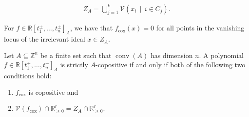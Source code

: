 \documentclass[10pt,a4paper]{amsart}
\DeclareMathOperator{\conv}{conv}
\newcommand{\RR}{\mathbb{R}}
\newcommand{\cox}{\mathrm{cox}}
\begin{document}
\begin{align}
\label{eq:decompositionIrrelevantLocus}
    Z_A=\bigcup_{j=1}^k\mathcal{V}(x_i\, \mid \, i\in C_j).
\end{align}

\begin{lemma}
\label{Lemma:VanishingOnIrrelevant}
For $f \in \RR[t_1^\pm , \dots, t_n^\pm]_A$, we have that $f_\cox(x)=0$ for all points in the vanishing locus of the irrelevant ideal $x \in Z_A$. 
\end{lemma}

\begin{proposition}
\label{prop:interiorCAcox}
Let $A \subseteq \mathbb{Z}^n$ be a finite set such that $\conv(A)$ has dimension $n$. 
  A polynomial $f \in \RR[t_1^\pm , \dots, t_n^\pm]_A$ is strictly $A$-copositive if and only if 
  both of the following two conditions hold: \begin{enumerate}
        \item[(i)] $f_\cox$ is copositive and
        \item[(ii)] $\mathcal{V}(f_\cox) \cap \RR^r_{\ge 0} = Z_A \cap \RR^r_{\ge 0}$.
    \end{enumerate}
\end{proposition}
\end{document}

